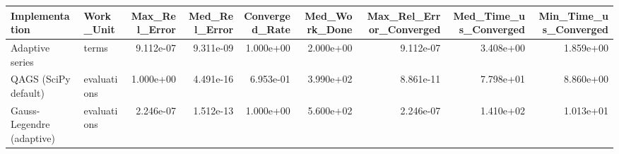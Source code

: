 \begin{tabular}{llrrrrrrr}
\toprule
Implementation & Work_Unit & Max_Rel_Error & Med_Rel_Error & Converged_Rate & Med_Work_Done & Max_Rel_Error_Converged & Med_Time_us_Converged & Min_Time_us_Converged \\
\midrule
Adaptive series & terms & 9.112e-07 & 9.311e-09 & 1.000e+00 & 2.000e+00 & 9.112e-07 & 3.408e+00 & 1.859e+00 \\
QAGS (SciPy default) & evaluations & 1.000e+00 & 4.491e-16 & 6.953e-01 & 3.990e+02 & 8.861e-11 & 7.798e+01 & 8.860e+00 \\
Gauss-Legendre (adaptive) & evaluations & 2.246e-07 & 1.512e-13 & 1.000e+00 & 5.600e+02 & 2.246e-07 & 1.410e+02 & 1.013e+01 \\
\bottomrule
\end{tabular}

